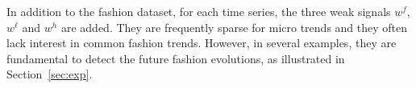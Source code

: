 \documentclass{article} %
\newcommand{\ts}{y}
\newcommand{\fullts}{{\bf \ts}}
\newcommand{\lag}{h}
\newcommand{\ws}{w}
\begin{document}
%


In addition to the fashion dataset, for each time series, the three weak signals $\ws^{f}$,$\ws^{\ell}$ and $\ws^{h}$ are added. They are frequently sparse for micro trends and they often lack interest in common fashion trends. However, in several examples, they are fundamental to detect the future fashion evolutions, as illustrated in Section~\ref{sec:exp}. 









\end{document}
